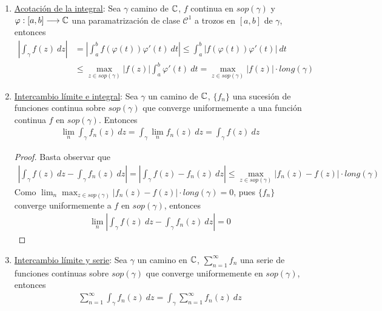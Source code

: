 \begin{obs}
    \begin{enumerate}
        \item \underline{Acotación de la integral}: Sea $\gamma$ camino de $\mathbb{C}$, $f$ continua en $sop(\gamma)$ y $\varphi : [a,b] \longrightarrow \mathbb{C}$ una paramatrización de clase $\mathcal{C}^1$ a trozos  en $[a,b]$ de $\gamma$, entonces
              \begin{align*}
                  \left| \int_{\gamma}{f(z) \ dz} \right| & = \left| \int_{a}^{b}{f(\varphi(t))\varphi'(t) \ dt} \right| \leq \int_{a}^{b}{\left|f(\varphi(t))\varphi'(t) \right|\ dt} \\
                                                          & \leq \max_{z \in sop(\gamma)} |f(z)|\int_{a}^{b}{\varphi'(t) \ dt} = \max_{z \in sop(\gamma)} |f(z)| \cdot long(\gamma)
              \end{align*}
        \item \underline{Intercambio límite e integral}: Sea $\gamma$ un camino de $\mathbb{C}$, $\{f_n\}$ una sucesión de funciones continua sobre $sop(\gamma)$ que converge uniformemente a una función continua $f$ en $sop(\gamma)$. Entonces
              \begin{align*}
                  \lim_{n}{\int_{\gamma}{f_n(z) \ dz}} = \int_{\gamma}{\lim_{n}f_n(z) \ dz} = \int_{\gamma}{f(z) \ dz}
              \end{align*}
              \begin{proof}
                  Basta observar que
                  \begin{align*}
                      \left| \int_{\gamma}{f(z) \ dz} -  \int_{\gamma}{f_n(z) \ dz}\right|= \left| \int_{\gamma}{f(z) - f_n(z) \ dz} \right| \leq \max_{z \in sop(\gamma)} |f_n(z) - f(z)| \cdot long(\gamma)
                  \end{align*}
                  Como $\lim_n{\max_{z \in sop(\gamma)} |f_n(z) - f(z)| \cdot long(\gamma)} = 0$, pues $\{f_n\}$ converge uniformemente a $f$ en $sop(\gamma)$, entonces
                  \begin{align*}
                      \lim_{n}  \left| \int_{\gamma}{f(z) \ dz} -  \int_{\gamma}{f_n(z) \ dz}\right| = 0
                  \end{align*}
              \end{proof}
        \item \underline{Intercambio límite y serie}: Sea $\gamma$ un camino en $\mathbb{C}$, $\sum_{n=1}^{\infty}{f_n}$ una serie de funciones continuas sobre $sop(\gamma)$ que converge uniformemente en $sop(\gamma)$, entonces
              \begin{align*}
                  \sum_{n=1}^{\infty} \int_{\gamma}{f_n(z) \ dz} = \int_{\gamma}{\sum_{n=1}^{\infty} f_n(z) \ dz}
              \end{align*}
    \end{enumerate}
\end{obs}

